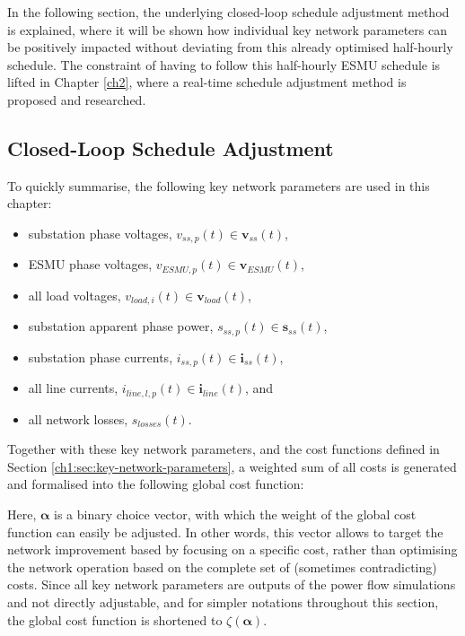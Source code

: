 In the following section, the underlying closed-loop schedule adjustment method is explained, where it will be shown how individual key network parameters can be positively impacted without deviating from this already optimised half-hourly schedule.
The constraint of having to follow this half-hourly ESMU schedule is lifted in Chapter \ref{ch2}, where a real-time schedule adjustment method is proposed and researched.

\subsection{Closed-Loop Schedule Adjustment}

To quickly summarise, the following key network parameters are used in this chapter:

\begin{itemize}
	\item substation phase voltages, $v_{ss,p}(t) \in \textbf{v}_{ss}(t)$,
	\item ESMU phase voltages, $v_{ESMU,p}(t) \in \textbf{v}_{ESMU}(t)$,
	\item all load voltages, $v_{load,i}(t) \in \textbf{v}_{load}(t)$,
	\item substation apparent phase power, $s_{ss,p}(t) \in \textbf{s}_{ss}(t)$,
	\item substation phase currents, $i_{ss,p}(t) \in \textbf{i}_{ss}(t)$,
	\item all line currents, $i_{line,l,p}(t) \in \textbf{i}_{line}(t)$, and
	\item all network losses, $s_{losses}(t)$.
\end{itemize}

Together with these key network parameters, and the cost functions defined in Section \ref{ch1:sec:key-network-parameters}, a weighted sum of all costs is generated and formalised into the following global cost function:



Here, $\boldsymbol{\alpha}$ is a binary choice vector, with which the weight of the global cost function can easily be adjusted.
In other words, this vector allows to target the network improvement based by focusing on a specific cost, rather than optimising the network operation based on the complete set of (sometimes contradicting) costs.
Since all key network parameters are outputs of the power flow simulations and not directly adjustable, and for simpler notations throughout this section, the global cost function is shortened to $\zeta(\boldsymbol{\alpha})$.

